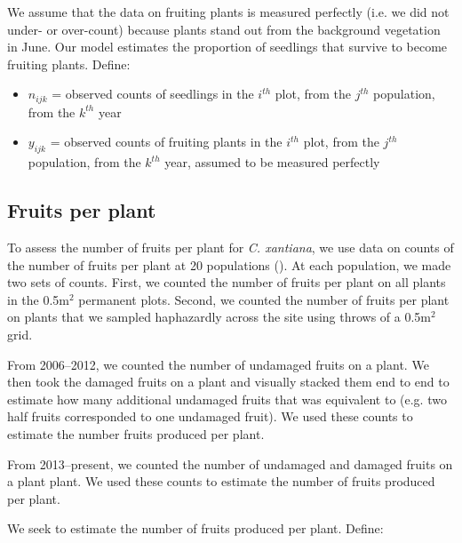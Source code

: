 \documentclass[12pt, oneside, titlepage]{article}   	%
\begin{document}
We assume that the data on fruiting plants is measured perfectly (i.e. we did not under- or over-count) because plants stand out from the background vegetation in June. Our model estimates the proportion of seedlings that survive to become fruiting plants. Define:

\begin{itemize}
	\item $n_{ijk}$ = observed counts of seedlings in the $i^{th}$ plot, from the $j^{th}$ population, from the $k^{th}$ year
	\item $y_{ijk}$ = observed counts of fruiting plants in the $i^{th}$ plot, from the $j^{th}$ population, from the $k^{th}$ year, assumed to be measured perfectly
\end{itemize}

\subsection{Fruits per plant}

To assess the number of fruits per plant for \textit{C. xantiana}, we use data on counts of the number of fruits per plant at 20 populations (\cite{eckhart2011}). At each population, we made two sets of counts. First, we counted the number of fruits per plant on all plants in the 0.5m$^2$ permanent plots. Second, we counted the number of fruits per plant on plants that we sampled haphazardly across the site using throws of a 0.5m$^2$ grid.

From 2006--2012, we counted the number of undamaged fruits on a plant. We then took the damaged fruits on a plant and visually stacked them end to end to estimate how many additional undamaged fruits that was equivalent to (e.g. two half fruits corresponded to one undamaged fruit). We used these counts to estimate the number fruits produced per plant. 

From 2013--present, we counted the number of undamaged and damaged fruits on a plant plant. We used these counts to estimate the number of fruits produced per plant.

We seek to estimate the number of fruits produced per plant. Define: 
\end{document}
